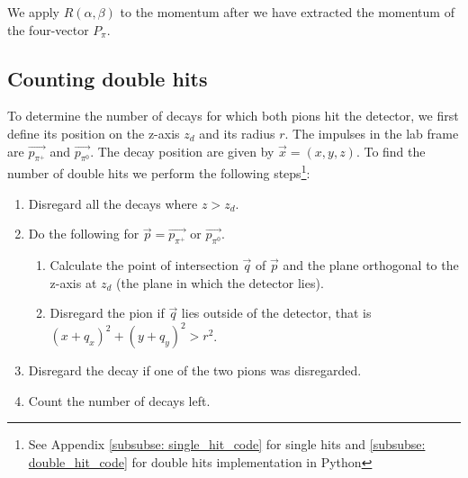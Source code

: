 \documentclass[12pt,a4paper,oneside,english]{article}
\begin{document}
We apply $R(\alpha, \beta)$ to the momentum after we have extracted	the momentum of the four-vector $P_{\pi}$.
		
\subsection{Counting double hits}
\label{hits}
		
To determine the number of decays for which both pions hit the detector, we first define its position on the z-axis $z_d$ and its radius $r$. The impulses in the lab frame are $\overrightarrow{p_{\pi^+}}$ and $\overrightarrow{p_{\pi^0}}$. The decay position are given by $\overrightarrow{x} = (x, y, z)$. To find the number of double hits we perform the following steps\footnote{See Appendix \ref{subsubse: single_hit_code} for single hits and \ref{subsubse: double_hit_code} for double hits implementation in Python}:
				
		\begin{enumerate}
			\item Disregard all the decays where $z > z_d$.
			\item Do the following for $\overrightarrow{p} = \overrightarrow{p_{\pi^+}}$ or $\overrightarrow{p_{\pi^0}}$.
			\begin{enumerate}
				\item Calculate the point of intersection $\overrightarrow{q}$ of $\overrightarrow{p}$ and the plane orthogonal to the z-axis at $z_d$ (the plane in which the detector lies).
				\item Disregard the pion if $\overrightarrow{q}$ lies outside of the detector, that is $ (x + q_x)^2 + (y + q_y)^2 > r^2$. %
			\end{enumerate}
			\item Disregard the decay if one of the two pions was disregarded.
			\item Count the number of decays left. %
		\end{enumerate}
	
%
	
%		
%		
%		
%		
\end{document}
